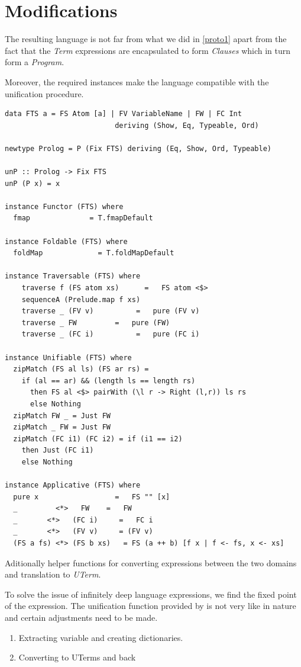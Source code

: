 \documentclass[thesis-solanki.tex]{subfiles}
\begin{document}
\clearpage
\section{Modifications}
The resulting language is not far from what we did in \ref{proto1} apart from the fact that the \textit{Term} expressions are encapsulated
to form \textit{Clauses} which in turn form a \textit{Program}.

Moreover, the required instances make the language compatible with the unification procedure.

\begin{verbatim}
data FTS a = FS Atom [a] | FV VariableName | FW | FC Int
                          deriving (Show, Eq, Typeable, Ord)

newtype Prolog = P (Fix FTS) deriving (Eq, Show, Ord, Typeable)

unP :: Prolog -> Fix FTS
unP (P x) = x

instance Functor (FTS) where
  fmap              = T.fmapDefault

instance Foldable (FTS) where
  foldMap             = T.foldMapDefault

instance Traversable (FTS) where
    traverse f (FS atom xs)      =   FS atom <$>
    sequenceA (Prelude.map f xs)
    traverse _ (FV v)          =   pure (FV v)
    traverse _ FW         =   pure (FW)
    traverse _ (FC i)          =   pure (FC i)

instance Unifiable (FTS) where
  zipMatch (FS al ls) (FS ar rs) =
    if (al == ar) && (length ls == length rs)
      then FS al <$> pairWith (\l r -> Right (l,r)) ls rs
      else Nothing
  zipMatch FW _ = Just FW
  zipMatch _ FW = Just FW
  zipMatch (FC i1) (FC i2) = if (i1 == i2)
    then Just (FC i1)
    else Nothing

instance Applicative (FTS) where
  pure x                  =   FS "" [x]
  _         <*>   FW    =   FW
  _       <*>   (FC i)     =   FC i
  _       <*>   (FV v)     = (FV v)
  (FS a fs) <*> (FS b xs)   = FS (a ++ b) [f x | f <- fs, x <- xs]
\end{verbatim}

Aditionally helper functions for converting expressions between the two domains and translation to \textit{UTerm}.

To solve the issue of infinitely deep language expressions, we find the fixed point of the expression. The unification function provided by 
\cite{prolog-lib} is not very  like in nature and certain adjustments need to be made. 
\begin{enumerate}
\item Extracting variable and creating dictionaries.

\item Converting to UTerms and back
\end{enumerate}
\end{document}
